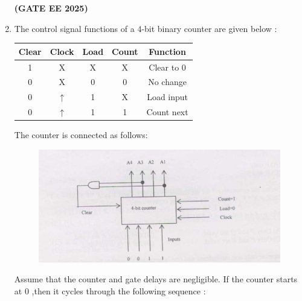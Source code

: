 \documentclass[journal,12pt,onecolumn]{IEEEtran}
\theoremstyle{remark}
\begin{document}
\begin{enumerate}
\begin{enumerate}
\begin{multicols}{4}
            
        \end{multicols}
    \end{enumerate}
    \hfill \textbf{(GATE EE 2025)}
    \item The control signal functions of a $4$-bit binary counter are given below :
    \newline
         \begin{tabular}{|c|c|c|c|c|}
         
        \hline 
      Clear & Clock & Load & Count & Function \\ \hline 
      1 & X & X & X & Clear to $0$ \\ \hline
      0 & X & 0 & 0 & No change \\ \hline
      0 & $\uparrow$ & 1 & X & Load input \\ \hline
      0 & $\uparrow$ & 1 & 1 & Count next \\ \hline
          
             
        \end{tabular}
 
     
  
       
       
    
        The counter is connected as follows:
       
            \begin{figure}[h]
                \centering
                \includegraphics[width=0.9\linewidth]{figs/fig3.png}
                \caption{ }
                \label{fig3}
            \end{figure} 

            
          Assume that the counter and gate delays are negligible. If the counter starts at $0$ ,then it cycles through the following sequence :
            \begin{enumerate}
\end{enumerate}
\end{enumerate}
\end{document}
